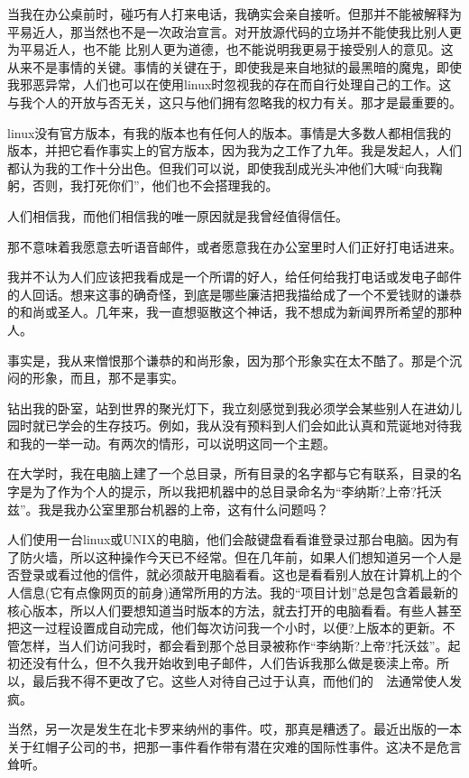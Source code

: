 当我在办公桌前时，碰巧有人打来电话，我确实会亲自接听。但那并不能被解释为平易近人，那当然也不是一次政治宣言。对开放源代码的立场并不能使我比别人更为平易近人，也不能 比别人更为道德，也不能说明我更易于接受别人的意见。这从来不是事情的关键。事情的关键在于，即使我是来自地狱的最黑暗的魔鬼，即使我邪恶异常，人们也可以在使用linux时忽视我的存在而自行处理自己的工作。这与我个人的开放与否无关，这只与他们拥有忽略我的权力有关。那才是最重要的。

linux没有官方版本，有我的版本也有任何人的版本。事情是大多数人都相信我的版本，并把它看作事实上的官方版本，因为我为之工作了九年。我是发起人，人们都认为我的工作十分出色。但我们可以说，即使我刮成光头冲他们大喊“向我鞠躬，否则，我打死你们”，他们也不会搭理我的。

人们相信我，而他们相信我的唯一原因就是我曾经值得信任。

那不意味着我愿意去听语音邮件，或者愿意我在办公室里时人们正好打电话进来。

我并不认为人们应该把我看成是一个所谓的好人，给任何给我打电话或发电子邮件的人回话。想来这事的确奇怪，到底是哪些廉洁把我描给成了一个不爱钱财的谦恭的和尚或圣人。几年来，我一直想驱散这个神话，我不想成为新闻界所希望的那种人。

事实是，我从来憎恨那个谦恭的和尚形象，因为那个形象实在太不酷了。那是个沉闷的形象，而且，那不是事实。

 

钻出我的卧室，站到世界的聚光灯下，我立刻感觉到我必须学会某些别人在进幼儿园时就已学会的生存技巧。例如，我从没有预料到人们会如此认真和荒诞地对待我和我的一举一动。有两次的情形，可以说明这同一个主题。

在大学时，我在电脑上建了一个总目录，所有目录的名字都与它有联系，目录的名字是为了作为个人的提示，所以我把机器中的总目录命名为“李纳斯?上帝?托沃兹”。我是我办公室里那台机器的上帝，这有什么问题吗？

人们使用一台linux或UNIX的电脑，他们会敲键盘看看谁登录过那台电脑。因为有了防火墙，所以这种操作今天已不经常。但在几年前，如果人们想知道另一个人是否登录或看过他的信件，就必须敲开电脑看看。这也是看看别人放在计算机上的个人信息(它有点像网页的前身)通常所用的方法。我的“项目计划”总是包含着最新的核心版本，所以人们要想知道当时版本的方法，就去打开的电脑看看。有些人甚至把这一过程设置成自动完成，他们每次访问我一个小时，以便?上版本的更新。不管怎样，当人们访问我时，都会看到那个总目录被称作“李纳斯?上帝?托沃兹”。起初还没有什么，但不久我开始收到电子邮件，人们告诉我那么做是亵渎上帝。所以，最后我不得不更改了它。这些人对待自己过于认真，而他们的　法通常使人发疯。

当然，另一次是发生在北卡罗来纳州的事件。哎，那真是糟透了。最近出版的一本关于红帽子公司的书，把那一事件看作带有潜在灾难的国际性事件。这决不是危言耸听。

